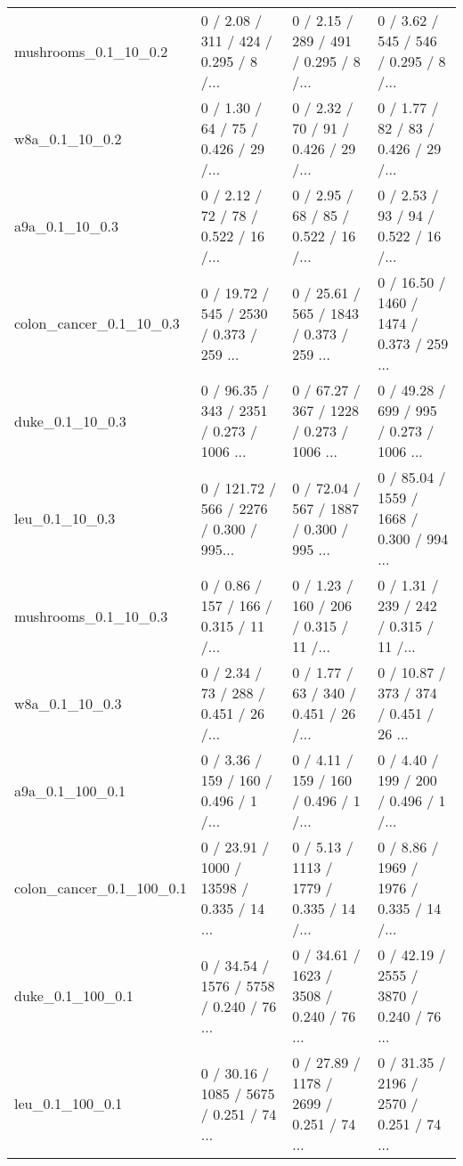 \begin{tabular}{llll}
      mushrooms\_0.1\_10\_0.2 &  0 / 2.08 /    311 /     424 / 0.295 /      8 /... &  0 / 2.15 /    289 /     491 / 0.295 /      8 /... &  0 / 3.62 /    545 /     546 / 0.295 /      8 /... \\
            w8a\_0.1\_10\_0.2 &  0 / 1.30 /     64 /      75 / 0.426 /     29 /... &  0 / 2.32 /     70 /      91 / 0.426 /     29 /... &  0 / 1.77 /     82 /      83 / 0.426 /     29 /... \\
            a9a\_0.1\_10\_0.3 &  0 / 2.12 /     72 /      78 / 0.522 /     16 /... &  0 / 2.95 /     68 /      85 / 0.522 /     16 /... &  0 / 2.53 /     93 /      94 / 0.522 /     16 /... \\
   colon\_cancer\_0.1\_10\_0.3 &  0 / 19.72 /    545 /    2530 / 0.373 /    259 ... &  0 / 25.61 /    565 /    1843 / 0.373 /    259 ... &  0 / 16.50 /   1460 /    1474 / 0.373 /    259 ... \\
           duke\_0.1\_10\_0.3 &  0 / 96.35 /    343 /    2351 / 0.273 /   1006 ... &  0 / 67.27 /    367 /    1228 / 0.273 /   1006 ... &  0 / 49.28 /    699 /     995 / 0.273 /   1006 ... \\
            leu\_0.1\_10\_0.3 &  0 / 121.72 /    566 /    2276 / 0.300 /    995... &  0 / 72.04 /    567 /    1887 / 0.300 /    995 ... &  0 / 85.04 /   1559 /    1668 / 0.300 /    994 ... \\
      mushrooms\_0.1\_10\_0.3 &  0 / 0.86 /    157 /     166 / 0.315 /     11 /... &  0 / 1.23 /    160 /     206 / 0.315 /     11 /... &  0 / 1.31 /    239 /     242 / 0.315 /     11 /... \\
            w8a\_0.1\_10\_0.3 &  0 / 2.34 /     73 /     288 / 0.451 /     26 /... &  0 / 1.77 /     63 /     340 / 0.451 /     26 /... &  0 / 10.87 /    373 /     374 / 0.451 /     26 ... \\
           a9a\_0.1\_100\_0.1 &  0 / 3.36 /    159 /     160 / 0.496 /      1 /... &  0 / 4.11 /    159 /     160 / 0.496 /      1 /... &  0 / 4.40 /    199 /     200 / 0.496 /      1 /... \\
  colon\_cancer\_0.1\_100\_0.1 &  0 / 23.91 /   1000 /   13598 / 0.335 /     14 ... &  0 / 5.13 /   1113 /    1779 / 0.335 /     14 /... &  0 / 8.86 /   1969 /    1976 / 0.335 /     14 /... \\
          duke\_0.1\_100\_0.1 &  0 / 34.54 /   1576 /    5758 / 0.240 /     76 ... &  0 / 34.61 /   1623 /    3508 / 0.240 /     76 ... &  0 / 42.19 /   2555 /    3870 / 0.240 /     76 ... \\
           leu\_0.1\_100\_0.1 &  0 / 30.16 /   1085 /    5675 / 0.251 /     74 ... &  0 / 27.89 /   1178 /    2699 / 0.251 /     74 ... &  0 / 31.35 /   2196 /    2570 / 0.251 /     74 ... \\

\end{tabular}
